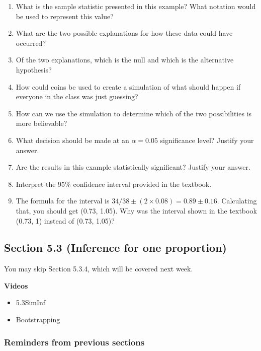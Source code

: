\documentclass[
]{report}
\providecommand{\tightlist}{%
  \setlength{\itemsep}{0pt}\setlength{\parskip}{0pt}}
\newcommand{\rgs}{\vspace{12pt}} %
\begin{document}
\begin{enumerate}
\def\labelenumi{\arabic{enumi}.}
\item
  What is the sample statistic presented in this example? What notation would be used to represent this value?
  \rgs
\item
  What are the two possible explanations for how these data could have occurred?
  \rgs
  \rgs
\item
  Of the two explanations, which is the null and which is the alternative hypothesis?
  \rgs
\item
  How could coins be used to create a simulation of what should happen if everyone in the class was just guessing?
  \rgs
  \rgs
  \rgs
\item
  How can we use the simulation to determine which of the two possibilities is more believable?
  \rgs
  \rgs
\item
  What decision should be made at an \(\alpha = 0.05\) significance level? Justify your answer.
  \rgs
\item
  Are the results in this example statistically significant? Justify your answer.
  \rgs
\item
  Interpret the 95\% confidence interval provided in the textbook.
  \rgs
  \rgs
\item
  The formula for the interval is \(34/38 \pm (2 \times 0.08) = 0.89 \pm 0.16\). Calculating that, you should get (0.73, 1.05). Why was the interval shown in the textbook (0.73, 1) instead of (0.73, 1.05)?
  \rgs
\end{enumerate}

\hypertarget{section-5.3-inference-for-one-proportion}{%
\subsection*{Section 5.3 (Inference for one proportion)}\label{section-5.3-inference-for-one-proportion}}


You may skip Section 5.3.4, which will be covered next week.

\textbf{Videos}

\begin{itemize}
\tightlist
\item
  5.3SimInf
\item
  Bootstrapping
\end{itemize}

\hypertarget{reminders-from-previous-sections}{%
\subsubsection*{Reminders from previous sections}\label{reminders-from-previous-sections}}
\end{document}

